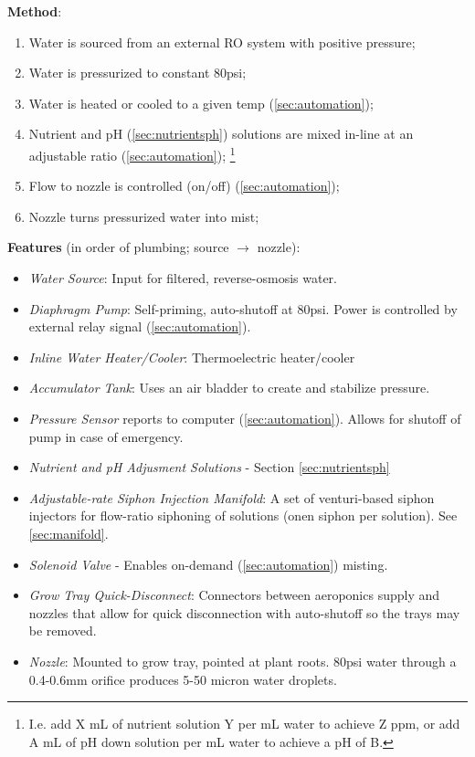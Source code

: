 \documentclass{report}
\begin{document}
\textbf{Method}:
\begin{enumerate} 
    \item Water is sourced from an external RO system with positive pressure;
    \item Water is pressurized to constant 80psi;
    \item Water is heated or cooled to a given temp (\ref{sec:automation}); %
    \item Nutrient and pH (\ref{sec:nutrientsph}) solutions are mixed in-line at an adjustable ratio (\ref{sec:automation}); \footnote{I.e. add X mL of nutrient solution Y per mL water to achieve Z ppm, or add A mL of pH down solution per mL water to achieve a pH of B.}
    \item Flow to nozzle is controlled (on/off) (\ref{sec:automation});
    \item Nozzle turns pressurized water into mist;
\end{enumerate}

\textbf{Features} (in order of plumbing; source $\to$ nozzle):
\begin{itemize}
    \item \textit{Water Source}: Input for filtered, reverse-osmosis water.
    \item \textit{Diaphragm Pump}: Self-priming, auto-shutoff at 80psi. Power is controlled by external relay signal (\ref{sec:automation}).
    \item \textit{Inline Water Heater/Cooler}: Thermoelectric heater/cooler
    \item \textit{Accumulator Tank}: Uses an air bladder to create and stabilize pressure.
    \item \textit{Pressure Sensor} reports to computer (\ref{sec:automation}). Allows for shutoff of pump in case of emergency.
    \item \textit{Nutrient and pH Adjusment Solutions} - Section \ref{sec:nutrientsph}
    \item \textit{Adjustable-rate Siphon Injection Manifold}: A set of venturi-based siphon injectors for flow-ratio siphoning of solutions (onen siphon per solution). See \ref{sec:manifold}.
    \item \textit{Solenoid Valve} - Enables on-demand (\ref{sec:automation}) misting.
    \item \textit{Grow Tray Quick-Disconnect}: Connectors between aeroponics supply and nozzles that allow for quick disconnection with auto-shutoff so the trays may be removed.
    \item \textit{Nozzle}: Mounted to grow tray, pointed at plant roots. 80psi water through a 0.4-0.6mm orifice produces 5-50 micron water droplets. %
\end{itemize}
\end{document}
